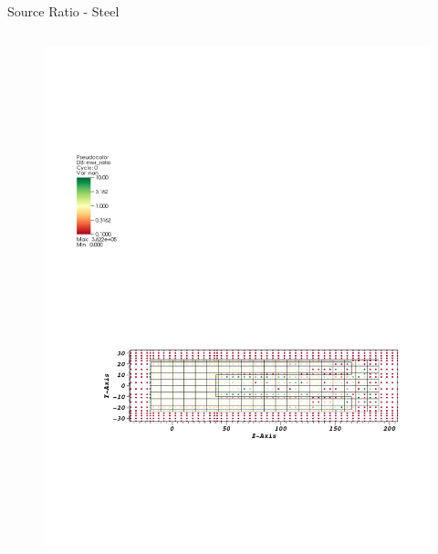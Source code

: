 \documentclass{beamer}
\begin{document}
\begin{frame}{Source Ratio - Steel}

  \begin{columns}[T]
        \begin{figure}
                \includegraphics[scale=0.5,trim={2.5cm 6cm 1cm 15cm},clip]{figs/src_ratio_mer.pdf}
        \end{figure}


\end{columns}
\end{frame}
\end{document}
